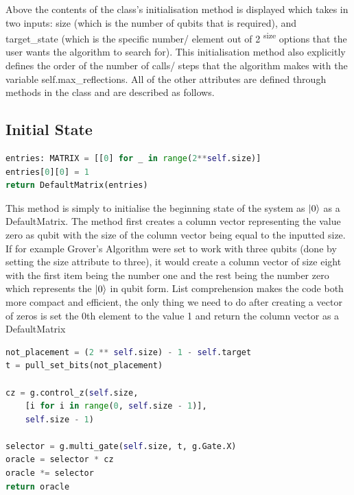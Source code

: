 \documentclass{article}
\begin{document}
Above the contents of the class's initialisation method is displayed which takes in two inputs: size (which is the number of qubits that is required), and target\_state (which is the specific number/ element out of 2 \textsuperscript{size} options that the user wants the algorithm to search for). This initialisation method also explicitly defines the order of the number of calls/ steps that the algorithm makes with the variable self.max\_reflections. All of the other attributes are defined through methods in the class and are described as follows.

\subsection{Initial State}

\begin{file}
\begin{lstlisting}[language=Python]
entries: MATRIX = [[0] for _ in range(2**self.size)]
entries[0][0] = 1
return DefaultMatrix(entries)
\end{lstlisting}
\end{file}

This method is simply to initialise the beginning state of the system as $\ket{0}$ as a DefaultMatrix. The method first creates a column vector representing the value zero as qubit with the size of the column vector being equal to the inputted size. If for example Grover's Algorithm were set to work with three qubits (done by setting the size attribute to three), it would create a column vector of size eight with the first item being the number one and the rest being the number zero which represents the $\ket{0}$ in qubit form. List comprehension makes the code both more compact and efficient, the only thing we need to do after creating a vector of zeros is set the 0th element to the value 1 and return the column vector as a DefaultMatrix

\begin{file}
\begin{lstlisting}[language=Python]
not_placement = (2 ** self.size) - 1 - self.target
t = pull_set_bits(not_placement)

cz = g.control_z(self.size, 
	[i for i in range(0, self.size - 1)],
	self.size - 1)
	
selector = g.multi_gate(self.size, t, g.Gate.X)
oracle = selector * cz
oracle *= selector
return oracle

\end{lstlisting}
\end{file}
\end{document}
